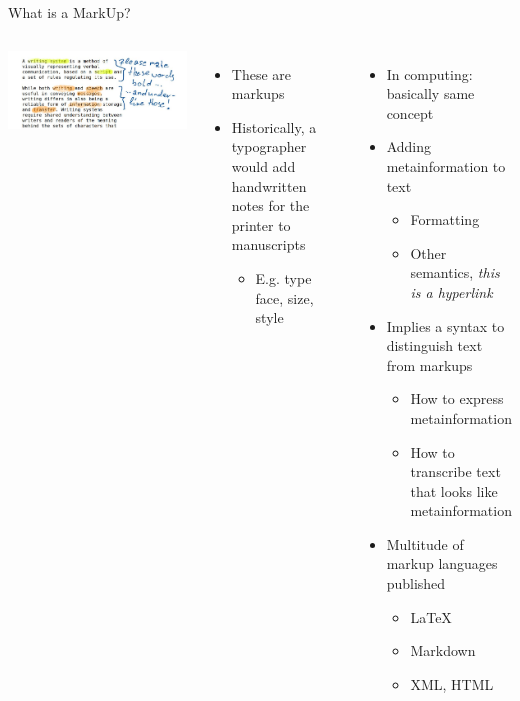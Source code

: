 
\begin{frame}{What is a MarkUp?}
%
\begin{columns}[T]
\includegraphics[width=\linewidth]{./gfx/22-markup}

\begin{itemize}
\item These are markups
\item Historically, a typographer would add handwritten notes for the printer to manuscripts
	\begin{itemize}
	\item E.\;g. type face, size, style
	\end{itemize}
\end{itemize}
%
\pause
%
\begin{itemize}
\item In computing: basically same concept
\item Adding metainformation to text
	\begin{itemize}
	\item Formatting
	\item Other semantics, \zB \emph{this is a hyperlink}
	\end{itemize}
\pause
\item Implies a syntax to distinguish text from markups
	\begin{itemize}
	\item How to express metainformation
	\item How to transcribe text that looks like metainformation
	\end{itemize}
\pause
\item Multitude of markup languages published
	\begin{itemize}
	\item \LaTeX
	\item Markdown
	\item XML, HTML
	\end{itemize}
\end{itemize}
\end{columns}
%
\end{frame}

